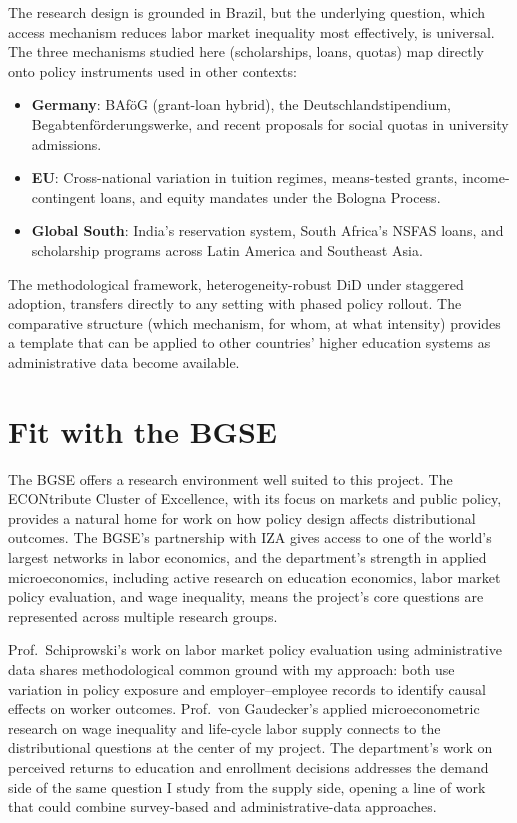 \documentclass[a4paper,11pt]{article}
\begin{document}
The research design is grounded in Brazil, but the underlying question, which access mechanism reduces labor market inequality most effectively, is universal. The three mechanisms studied here (scholarships, loans, quotas) map directly onto policy instruments used in other contexts:

\begin{itemize}[nosep]
    \item \textbf{Germany}: BAf\"oG (grant-loan hybrid), the Deutschlandstipendium, Begabtenf\"orderungswerke, and recent proposals for social quotas in university admissions.
    \item \textbf{EU}: Cross-national variation in tuition regimes, means-tested grants, income-contingent loans, and equity mandates under the Bologna Process.
    \item \textbf{Global South}: India's reservation system, South Africa's NSFAS loans, and scholarship programs across Latin America and Southeast Asia.
\end{itemize}

The methodological framework, heterogeneity-robust DiD under staggered adoption, transfers directly to any setting with phased policy rollout. The comparative structure (which mechanism, for whom, at what intensity) provides a template that can be applied to other countries' higher education systems as administrative data become available.

\section{Fit with the BGSE}

The BGSE offers a research environment well suited to this project. The ECONtribute Cluster of Excellence, with its focus on markets and public policy, provides a natural home for work on how policy design affects distributional outcomes. The BGSE's partnership with IZA gives access to one of the world's largest networks in labor economics, and the department's strength in applied microeconomics, including active research on education economics, labor market policy evaluation, and wage inequality, means the project's core questions are represented across multiple research groups.

Prof.\ Schiprowski's work on labor market policy evaluation using administrative data shares methodological common ground with my approach: both use variation in policy exposure and employer--employee records to identify causal effects on worker outcomes. Prof.\ von Gaudecker's applied microeconometric research on wage inequality and life-cycle labor supply connects to the distributional questions at the center of my project. The department's work on perceived returns to education and enrollment decisions addresses the demand side of the same question I study from the supply side, opening a line of work that could combine survey-based and administrative-data approaches.
\end{document}
